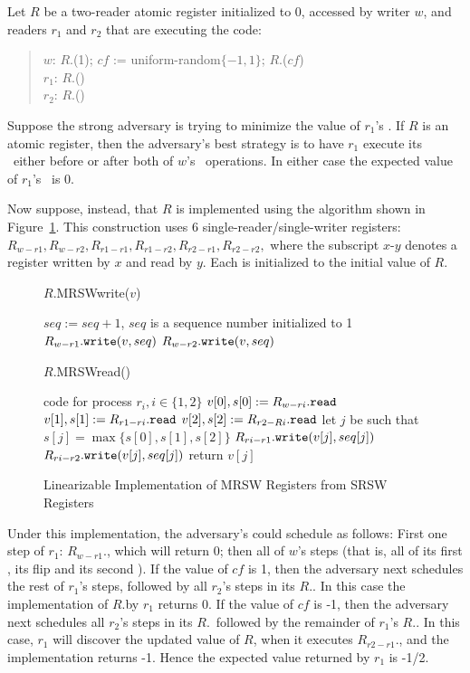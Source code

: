 \documentclass[11pt,letterpaper]{article}
\def\read{\text{\tt read}\xspace}
\newcommand{\xwrite}{\text{\tt write}\xspace}
\begin{document}
Let $R$ be a two-reader atomic register initialized to 0,
accessed by writer $w$, and readers $r_1$ and $r_2$ that are executing the code:
\begin{quote}
$w$: $R$.\MRwrite(1); \quad  $cf$ := uniform-random$\{-1,1\}$; \quad   $R$.\MRwrite($cf$)  \\
$r_1$:  $R$.\MRread () \\
$r_2$:  $R$.\MRread ()
\end{quote}

Suppose the strong adversary is trying to minimize the value of $r_1$'s \MRread.
If $R$ is an atomic register,
then the adversary's best strategy is to have $r_1$ execute its
\MRread\ either before or after both of $w$'s \MRwrite\ operations.
In either case the expected value of $r_1$'s \MRread\ is 0.

Now suppose, instead, that $R$ is implemented using
the algorithm shown in Figure~\ref{fig:multireader_registers}.
This construction
uses 6 single-reader/single-writer registers:
$R_{w-r1}, R_{w-r2},R_{r1-r1},R_{r1-r2},R_{r2-r1},R_{r2-r2},$
where the subscript $x$-$y$ denotes a register written by $x$ and read by $y$.
Each is initialized to the initial value of $R$.

\begin{figure}
 \begin{minipage}[t]{.4\textwidth}
 \begin{function}[H]
   \caption{$R$.MRSWwrite($v$)}
    $seq := seq + 1$, $seq$ is a sequence number initialized to 1\;
    $R_{w-r1}.\xwrite(v,seq)$ \;
    $R_{w-r2}.\xwrite(v,seq)$

 \end{function}
 \end{minipage}\hfill
 \begin{minipage}[t]{.55\textwidth}
 \begin{function}[H]
   \caption{$R$.MRSWread()}
    code for process $r_i, i \in \{1,2\}$ \;
   $v[0], s[0] : = R_{w-ri}.\read $ \;
   $v[1], s[1] : = R_{r1-ri}.\read $ \;
   $v[2], s[2] : = R_{r2-Ri}.\read $ \;
   let $j$ be such that $s[j] = \max \{ s[0],s[1], s[2] \}$ \;
   $R_{ri-r1}.\xwrite(v[j],seq[j])$ \;
   $R_{ri-r2}.\xwrite(v[j],seq[j])$ \;
   return $v[j]$
 \end{function}
 \end{minipage}\caption{Linearizable Implementation of MRSW Registers from SRSW Registers}\label{fig:multireader_registers}
\end{figure}

Under this implementation, the adversary's could schedule as follows:
First one step of $r_1$: $R_{w-r1}$.\read, which will return 0;
then all of $w$'s steps (that is,  all of its first \MRwrite, its flip and its second \MRwrite).
If the value of $cf$ is 1,
then the adversary next schedules the rest of $r_1$'s steps,
followed by all $r_2$'s steps in its $R$.\MRread.
In this case the implementation of $R$.\MRread by $r_1$ returns 0.
If the value of $cf$ is -1,
then the adversary next schedules all $r_2$'s steps in its $R$.\MRread\
followed by the remainder of $r_1$'s $R$.\MRread.
In this case, $r_1$ will discover the updated value of $R$, when it
executes $R_{r2-r1}$.\read, and the implementation returns -1.
Hence the expected value returned by $r_1$ is -1/2.
\end{document}
